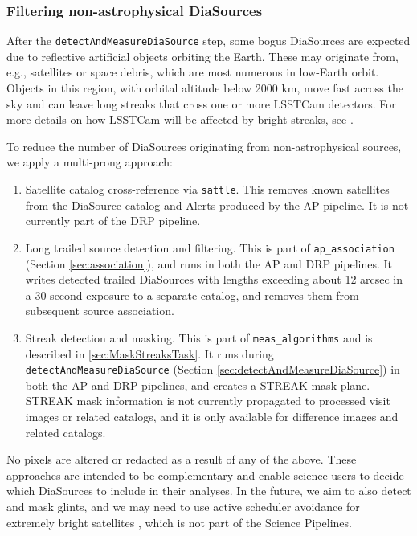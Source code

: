 \subsubsection{Filtering non-astrophysical DiaSources}
\label{sec:streaks}

After the \texttt{detectAndMeasureDiaSource} step, some bogus DiaSources are expected due to reflective artificial objects orbiting the Earth.
These may originate from, e.g., satellites or space debris, which are most numerous in low-Earth orbit.
Objects in this region, with orbital altitude below 2000 km, move fast across the sky and can leave long streaks that cross one or more LSSTCam detectors.
For more details on how LSSTCam will be affected by bright streaks, see \citet{2020AJ....160..226T,2022A&C....3900584H,2024SPIE13103E..1ZP,2024SPIE13103E..21S,2025arXiv250205418P}.

To reduce the number of DiaSources originating from non-astrophysical sources, we apply a multi-prong approach:

\begin{enumerate}
\item Satellite catalog cross-reference via \texttt{sattle}.
This removes known satellites from the DiaSource catalog and Alerts produced by the AP pipeline.
It is not currently part of the DRP pipeline.

\item Long trailed source detection and filtering.
This is part of \texttt{ap\_association} (Section \ref{sec:association}), and runs in both the AP and DRP pipelines.
It writes detected trailed DiaSources with lengths exceeding about 12 arcsec in a 30 second exposure to a separate catalog, and removes them from subsequent source association.

\item Streak detection and masking.
This is part of \texttt{meas\_algorithms} and is described in \ref{sec:MaskStreaksTask}.
It runs during \texttt{detectAndMeasureDiaSource} (Section \ref{sec:detectAndMeasureDiaSource}) in both the AP and DRP pipelines, and creates a STREAK mask plane.
STREAK mask information is not currently propagated to processed visit images or related catalogs, and it is only available for difference images and related catalogs.
\end{enumerate}

No pixels are altered or redacted as a result of any of the above.
These approaches are intended to be complementary and enable science users to decide which DiaSources to include in their analyses.
In the future, we aim to also detect and mask glints, and we may need to use active scheduler avoidance for extremely bright satellites \citep{2022ApJ...941L..15H}, which is not part of the Science Pipelines.

